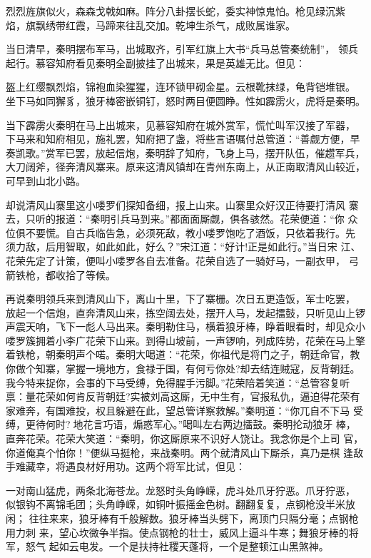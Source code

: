 烈烈旌旗似火，森森戈戟如麻。阵分八卦摆长蛇，委实神惊鬼怕。枪见绿沉紫
焰，旗飘绣带红霞，马蹄来往乱交加。乾坤生杀气，成败属谁家。

当日清早，秦明摆布军马，出城取齐，引军红旗上大书“兵马总管秦统制”，
领兵起行。慕容知府看见秦明全副披挂了出城来，果是英雄无比。但见：

盔上红缨飘烈焰，锦袍血染猩猩，连环锁甲砌金星。云根靴抹绿，龟背铠堆银。
坐下马如同獬豸，狼牙棒密嵌铜钉，怒时两目便圆睁。性如霹雳火，虎将是秦明。

当下霹雳火秦明在马上出城来，见慕容知府在城外赏军，慌忙叫军汉接了军器，
下马来和知府相见，施礼罢，知府把了盏，将些言语嘱付总管道：“善觑方便，早
奏凯歌。”赏军已罢，放起信炮，秦明辞了知府，飞身上马，摆开队伍，催趱军兵，
大刀阔斧，径奔清风寨来。原来这清风镇却在青州东南上，从正南取清风山较近，
可早到山北小路。

却说清风山寨里这小喽罗们探知备细，报上山来。山寨里众好汉正待要打清风
寨去，只听的报道：“秦明引兵马到来。”都面面厮觑，俱各骇然。花荣便道：“你
众位俱不要慌。自古兵临告急，必须死敌，教小喽罗饱吃了酒饭，只依着我行。先
须力敌，后用智取，如此如此，好么？”宋江道：“好计!正是如此行。”当日宋
江、花荣先定了计策，便叫小喽罗各自去准备。花荣自选了一骑好马，一副衣甲，
弓箭铁枪，都收拾了等候。

再说秦明领兵来到清风山下，离山十里，下了寨栅。次日五更造饭，军士吃罢，
放起一个信炮，直奔清风山来，拣空阔去处，摆开人马，发起擂鼓，只听见山上锣
声震天响，飞下一彪人马出来。秦明勒住马，横着狼牙棒，睁着眼看时，却见众小
喽罗簇拥着小李广花荣下山来。到得山坡前，一声锣响，列成阵势，花荣在马上擎
着铁枪，朝秦明声个喏。秦明大喝道：“花荣，你祖代是将门之子，朝廷命官，教
你做个知寨，掌握一境地方，食禄于国，有何亏你处?却去结连贼寇，反背朝廷。
我今特来捉你，会事的下马受缚，免得腥手污脚。”花荣陪着笑道：“总管容复听
禀：量花荣如何肯反背朝廷?实被刘高这厮，无中生有，官报私仇，逼迫得花荣有
家难奔，有国难投，权且躲避在此，望总管详察救解。”秦明道：“你兀自不下马
受缚，更待何时?地花言巧语，煽惑军心。”喝叫左右两边擂鼓。秦明抡动狼牙
棒，直奔花荣。花荣大笑道：“秦明，你这厮原来不识好人饶让。我念你是个上司
官，你道俺真个怕你！”便纵马挺枪，来战秦明。两个就清风山下厮杀，真乃是棋
逢敌手难藏幸，将遇良材好用功。这两个将军比试，但见：

一对南山猛虎，两条北海苍龙。龙怒时头角峥嵘，虎斗处爪牙狞恶。爪牙狞恶，
似银钩不离锦毛团；头角峥嵘，如铜叶振摇金色树。翻翻复复，点钢枪没半米放闲；
往往来来，狼牙棒有千般解数。狼牙棒当头劈下，离顶门只隔分毫；点钢枪用力刺
来，望心坎微争半指。使点钢枪的壮士，威风上逼斗牛寒；舞狼牙棒的将军，怒气
起如云电发。一个是扶持社稷天蓬将，一个是整顿江山黑煞神。

